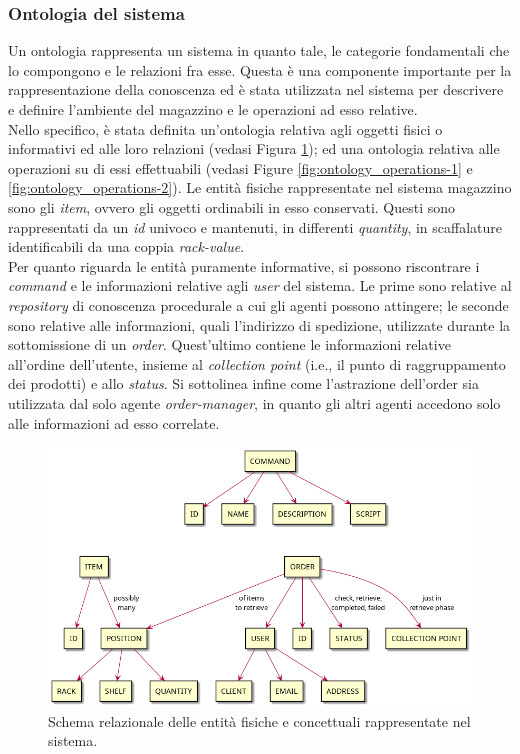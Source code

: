 \subsubsection{Ontologia del sistema}
Un ontologia rappresenta un sistema in quanto tale, le categorie fondamentali che lo compongono e le relazioni fra esse. Questa è una componente importante per la rappresentazione della conoscenza ed è stata utilizzata nel sistema per descrivere e definire l'ambiente del magazzino e le operazioni ad esso relative.\\
Nello specifico, è stata definita un'ontologia relativa agli oggetti fisici o informativi ed alle loro relazioni (vedasi Figura \ref{fig:ontology_abstractions}); ed una ontologia relativa alle operazioni su di essi effettuabili (vedasi Figure \ref{fig:ontology_operations-1} e \ref{fig:ontology_operations-2}).
%
\parag
Le entità fisiche rappresentate nel sistema magazzino sono gli \textit{item}, ovvero gli oggetti ordinabili in esso conservati. Questi sono rappresentati da un \textit{id} univoco e mantenuti, in differenti \textit{quantity}, in scaffalature identificabili da una coppia \textit{rack-value}.\\
Per quanto riguarda le entità puramente informative, si possono riscontrare i \textit{command} e le informazioni relative agli \textit{user} del sistema. Le prime sono relative al \textit{repository} di conoscenza procedurale a cui gli agenti possono attingere; le seconde sono relative alle informazioni, quali l'indirizzo di spedizione, utilizzate durante la sottomissione di un \textit{order}. Quest'ultimo contiene le informazioni relative all'ordine dell'utente, insieme al \textit{collection point} (i.e., il punto di raggruppamento dei prodotti) e allo \textit{status}. Si sottolinea infine come l'astrazione dell'order sia utilizzata dal solo agente \textit{order-manager}, in quanto gli altri agenti accedono solo alle informazioni ad esso correlate.
\begin{figure}[!ht]\centering
    \includegraphics[width=\textwidth]{section/design/figure/ontology/ontology-abstractions.png}
    \caption{Schema relazionale delle entità fisiche e concettuali rappresentate nel sistema.}
    \label{fig:ontology_abstractions}
\end{figure}
